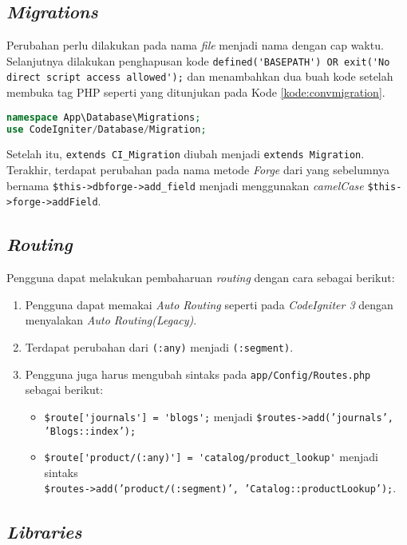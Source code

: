 \subsection{\textit{Migrations}}

Perubahan perlu dilakukan pada nama \textit{file} menjadi nama dengan cap waktu. Selanjutnya dilakukan penghapusan kode \verb|defined('BASEPATH') OR exit('No direct script access allowed');| dan menambahkan dua buah kode setelah membuka tag PHP seperti yang ditunjukan pada Kode \ref{kode:convmigration}.
\begin{lstlisting}[language=PHP, caption=Penambahan kode pada \textit{file migration}. ,label=kode:convmigration]
namespace App\Database\Migrations;
use CodeIgniter/Database/Migration;
\end{lstlisting}
Setelah itu, \verb|extends CI_Migration| diubah menjadi \verb|extends Migration|. Terakhir, terdapat perubahan pada nama metode \textit{Forge} dari yang sebelumnya bernama \verb|$this->dbforge->add_field| menjadi menggunakan \textit{camelCase} \verb|$this->forge->addField|.

\subsection{\textit{Routing}}

Pengguna dapat melakukan pembaharuan \textit{routing} dengan cara sebagai berikut:
\begin{enumerate}
\item Pengguna dapat memakai \textit{Auto Routing} seperti pada \textit{CodeIgniter 3} dengan menyalakan \textit{Auto Routing(Legacy)}.
\item Terdapat perubahan dari \verb|(:any)| menjadi \verb|(:segment)|.
\item Pengguna juga harus mengubah sintaks pada \verb|app/Config/Routes.php| sebagai berikut:
	\begin{itemize}
	\item \verb|$route['journals'] = 'blogs';| menjadi \texttt{\$routes->add('journals', 'Blogs::index');} 
	\item \verb|$route['product/(:any)'] = 'catalog/product_lookup'| menjadi sintaks 		\\ \texttt{\$routes->add('product/(:segment)', 'Catalog::productLookup');}.
	\end{itemize}
\end{enumerate}

\subsection{\textit{Libraries}}
 
